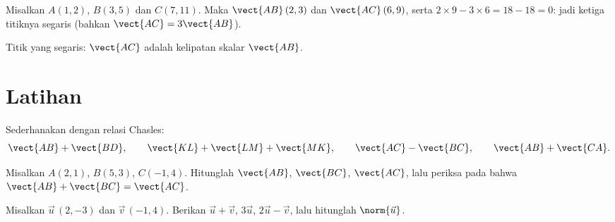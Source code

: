 \begin{example}\label{ex:g10:vectors:alignment}
Misalkan $A(1, 2)$, $B(3, 5)$ dan $C(7, 11)$. Maka $\vect{AB}\,(2, 3)$ dan
$\vect{AC}\,(6, 9)$, serta $2 \times 9 - 3 \times 6 = 18 - 18 = 0$: jadi
ketiga titiknya segaris (bahkan $\vect{AC} = 3\vect{AB}$).
\end{example}

\begin{omfigure}

{\small Titik yang segaris: $\vect{AC}$ adalah kelipatan skalar $\vect{AB}$.}
\end{omfigure}

\section{Latihan}

\begin{exercise}[$\star$]\label{exo:g10:vectors:1}
Sederhanakan dengan relasi Chasles:
\[
\vect{AB} + \vect{BD}, \qquad
\vect{KL} + \vect{LM} + \vect{MK}, \qquad
\vect{AC} - \vect{BC}, \qquad
\vect{AB} + \vect{CA}.
\]
\end{exercise}

\begin{exercise}[$\star$]\label{exo:g10:vectors:2}
Misalkan $A(2, 1)$, $B(5, 3)$, $C(-1, 4)$. Hitunglah 
$\vect{AB}$, $\vect{BC}$, $\vect{AC}$, lalu periksa pada  bahwa
$\vect{AB} + \vect{BC} = \vect{AC}$.
\end{exercise}

\begin{exercise}[$\star$]\label{exo:g10:vectors:3}
Misalkan $\vec u\,(2, -3)$ dan $\vec v\,(-1, 4)$. Berikan 
$\vec u + \vec v$, $3\vec u$, $2\vec u - \vec v$, lalu hitunglah
$\norm{\vec u}$.
\end{exercise}

